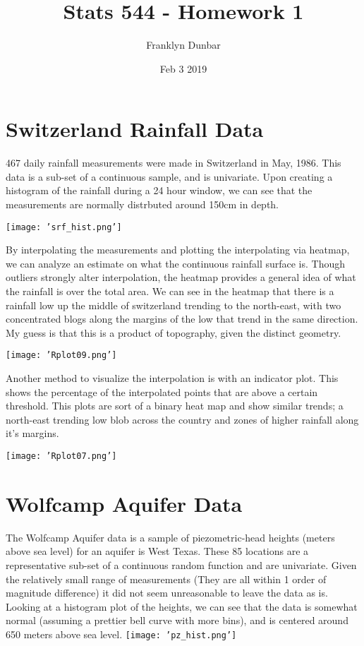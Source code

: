 \documentclass[12pt]{article}
\title{Stats 544 - Homework 1}
\author{Franklyn Dunbar}
\date{Feb 3 2019}
\begin{document}
\section*{Switzerland Rainfall Data}
467 daily rainfall measurements were made in Switzerland in May, 1986. This data is a sub-set of a continuous sample, and is univariate. Upon creating a histogram of the rainfall during a 24 hour window, we can see that the measurements are normally distrbuted around 150cm in depth.

\texttt{[image: 'srf\_hist.png']}
\newline

By interpolating the measurements and plotting the interpolating via heatmap, we can analyze an estimate on what the continuous rainfall surface is. Though outliers strongly alter interpolation, the heatmap provides a general idea of what the rainfall is over the total area. We can see in the heatmap that there is a rainfall low up the middle of switzerland trending to the north-east, with two concentrated blogs along the margins of the low that trend in the same direction. My guess is that this is a product of topography, given the distinct geometry. 
\newline

\texttt{[image: 'Rplot09.png']}
\newline

Another method to visualize the interpolation is with an indicator plot. This shows the percentage of the interpolated points that are above a certain threshold. This plots are sort of a binary heat map and show similar trends; a north-east trending low blob across the country and zones of higher rainfall along it's margins. 

\texttt{[image: 'Rplot07.png']}

\section*{Wolfcamp Aquifer Data}
The Wolfcamp Aquifer data is a sample of piezometric-head heights (meters above sea level) for an aquifer is West Texas. These 85 locations are a representative sub-set of a continuous random function and are univariate. Given the relatively small range of measurements (They are all within 1 order of magnitude difference) it did not seem unreasonable to leave the data as is. 
Looking at a histogram plot of the heights, we can see that the data is somewhat normal (assuming a prettier bell curve with more bins), and is centered around 650 meters above sea level. 
\newline
\texttt{[image: 'pz\_hist.png']}
\newline
\end{document}
